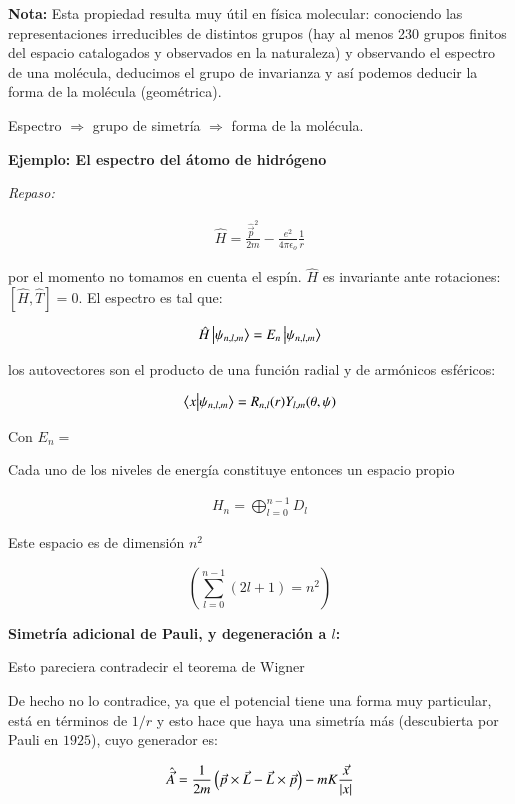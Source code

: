 \textbf{Nota:}
Esta propiedad resulta muy útil en física molecular: conociendo las representaciones irreducibles de distintos grupos (hay al menos 230 grupos finitos del espacio catalogados y observados en la naturaleza) y observando el espectro de una molécula, deducimos el grupo de invarianza y así podemos deducir la forma de la molécula (geométrica).

Espectro $\Rightarrow $ grupo de simetría $\Rightarrow$ forma de la molécula.

\textbf{Ejemplo: El espectro del átomo de hidrógeno}

\textit{Repaso:}

\begin{align*}
    \hat{H}=\frac{\hat{\vec{p}}^2}{2m}-\frac{e^2}{4\pi\epsilon_o}\frac{1}{r} 
\end{align*}

por el momento no tomamos en cuenta el espín. $\hat{H}$ es invariante ante rotaciones: $\left[\hat{H},\hat{T}\right]=0$. El espectro es tal que:

\begin{align*}
    \hat{H}\ket{\psi_{n,l,m}}=E_n\ket{\psi_{n,l,m}}   
\end{align*}


los autovectores son el producto de una función radial y de armónicos esféricos:

\begin{align*}
    \bra{x}\ket{\psi_{n,l,m}}=R_{n,l}(r)Y_{l,m}(\theta,\psi)
\end{align*}

Con $E_n=$

Cada uno de los niveles de energía constituye entonces un espacio propio 

\begin{align*}
    H_n=\bigoplus_{l=0}^{n-1}D_l
\end{align*}

Este espacio es de dimensión $n^2$

$$
\left(\sum_{l=0}^{n-1}(2l+1)=n^2\right)
$$

\textbf{Simetría adicional de Pauli, y degeneración a $l$:}

Esto pareciera contradecir el teorema de Wigner

De hecho no lo contradice, ya que el potencial tiene una forma muy particular, está en términos de $1/r$ y esto hace que haya una simetría más (descubierta por Pauli en $1925$), cuyo generador es:

\begin{align*}
    \hat{\vec{A}}=\frac{1}{2m}\left(\vec{p}\times\vec{L}-\vec{L}\times\vec{p}\right)-mK\frac{\vec{x}}{\abs{x}}
\end{align*}

